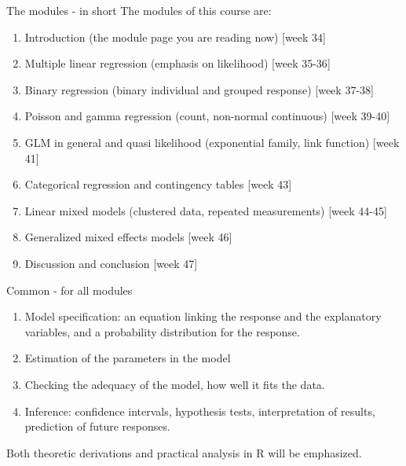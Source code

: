 \documentclass[
  ignorenonframetext,
]{beamer}
\begin{document}
\begin{frame}
\begin{block}{The modules - in short}
\label{the-modules---in-short}
The modules of this course are:

\begin{enumerate}
\item
  Introduction (the module page you are reading now) {[}week 34{]}
\item
  Multiple linear regression (emphasis on likelihood) {[}week 35-36{]}
\item
  Binary regression (binary individual and grouped response) {[}week
  37-38{]}
\item
  Poisson and gamma regression (count, non-normal continuous) {[}week
  39-40{]}
\item
  GLM in general and quasi likelihood (exponential family, link
  function) {[}week 41{]}
\item
  Categorical regression and contingency tables {[}week 43{]}
\item
  Linear mixed models (clustered data, repeated measurements) {[}week
  44-45{]}
\item
  Generalized mixed effects models {[}week 46{]}
\item
  Discussion and conclusion {[}week 47{]}
\end{enumerate}
\end{block}
\end{frame}

\begin{frame}
\begin{block}{Common - for all modules}
\label{common---for-all-modules}
\begin{enumerate}
\item
  Model specification: an equation linking the response and the
  explanatory variables, and a probability distribution for the
  response.
\item
  Estimation of the parameters in the model
\item
  Checking the adequacy of the model, how well it fits the data.
\item
  Inference: confidence intervals, hypothesis tests, interpretation of
  results, prediction of future responses.
\end{enumerate}

Both theoretic derivations and practical analysis in R will be
emphasized.
\end{block}
\end{frame}
\end{document}
